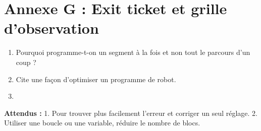 \documentclass[11pt,a4paper]{article}
\begin{document}
\newpage
\section*{Annexe G : Exit ticket et grille d'observation}

\begin{enumerate}
 \item Pourquoi programme-t-on un segment à la fois et non tout le parcours d'un coup ?\\ \lig
 \item Cite une façon d'optimiser un programme de robot.\\ \lig
 \item \autoeval
\end{enumerate}
\textbf{Attendus :} 1. Pour trouver plus facilement l'erreur et corriger un seul réglage. 2. Utiliser une boucle ou une variable, réduire le nombre de blocs.

\bigskip
{}
\end{document}
